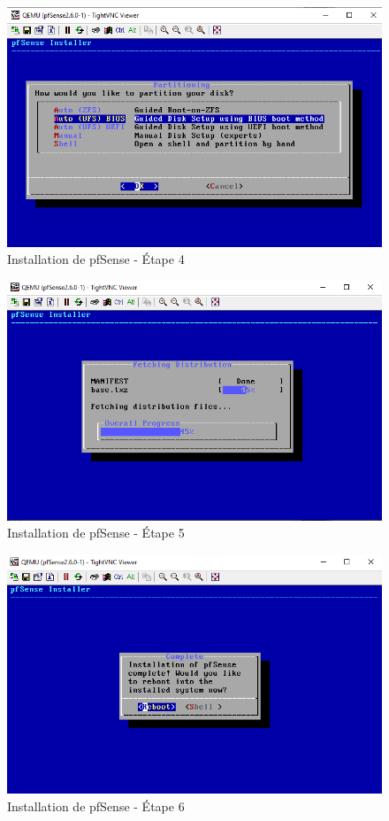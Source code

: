 \begin{figure}[H]
\centering
\includegraphics[width=15cm]{Images/BRadesMelian-Topologie5.png}
\caption{Installation de pfSense - Étape 4}
\label{Chap3.3.5}
\end{figure}

\begin{figure}[H]
\centering
\includegraphics[width=15cm]{Images/BRadesMelian-Topologie6.png}
\caption{Installation de pfSense - Étape 5}
\label{Chap3.3.6}
\end{figure}

\begin{figure}[H]
\centering
\includegraphics[width=15cm]{Images/BRadesMelian-Topologie7.png}
\caption{Installation de pfSense - Étape 6}
\label{Chap3.3.7}
\end{figure}

